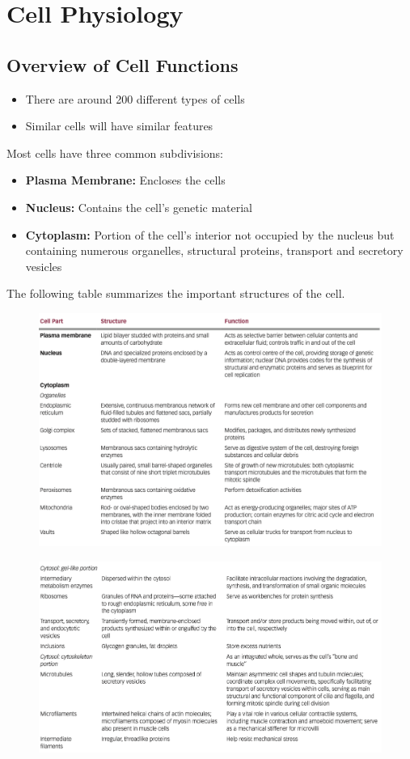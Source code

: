 \documentclass[11pt]{article}
\begin{document}
\pagebreak




\section{Cell Physiology}
\subsection{Overview of Cell Functions }
\begin{itemize}
\item There are around 200 different types of cells
\item Similar cells will have similar features
\end{itemize}
Most cells have three common subdivisions:
\begin{itemize}
\item \textbf{Plasma Membrane:}  Encloses the cells
\item \textbf{Nucleus:} Contains the cell's genetic material
\item \textbf{Cytoplasm:} Portion of the cell's interior not occupied by the nucleus but containing numerous organelles, structural proteins, transport and secretory vesicles
\end{itemize}
The following table summarizes the important structures of the cell. 
\begin{figure}[bp!]
\includegraphics[scale=0.85]{cells1}
\end{figure}
\begin{figure}[htbp!]
\includegraphics[scale=0.85]{cells2}
\end{figure}
\\
\end{document}

